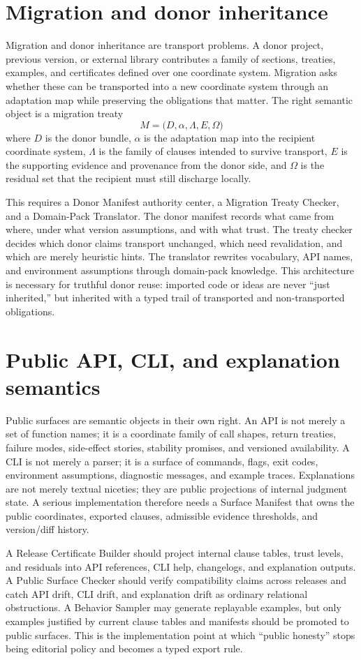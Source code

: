 \documentclass[11pt]{report}
\begin{document}
\section{Migration and donor inheritance}
Migration and donor inheritance are transport problems. A donor project, previous version, or external library contributes a family of sections, treaties, examples, and certificates defined over one coordinate system. Migration asks whether these can be transported into a new coordinate system through an adaptation map while preserving the obligations that matter. The right semantic object is a migration treaty
\[
M=\bigl(D,\alpha,\Lambda,E,\Omega\bigr)
\]
where $D$ is the donor bundle, $\alpha$ is the adaptation map into the recipient coordinate system, $\Lambda$ is the family of clauses intended to survive transport, $E$ is the supporting evidence and provenance from the donor side, and $\Omega$ is the residual set that the recipient must still discharge locally.

This requires a Donor Manifest authority center, a Migration Treaty Checker, and a Domain-Pack Translator. The donor manifest records what came from where, under what version assumptions, and with what trust. The treaty checker decides which donor claims transport unchanged, which need revalidation, and which are merely heuristic hints. The translator rewrites vocabulary, API names, and environment assumptions through domain-pack knowledge. This architecture is necessary for truthful donor reuse: imported code or ideas are never ``just inherited,'' but inherited with a typed trail of transported and non-transported obligations.
\section{Public API, CLI, and explanation semantics}
Public surfaces are semantic objects in their own right. An API is not merely a set of function names; it is a coordinate family of call shapes, return treaties, failure modes, side-effect stories, stability promises, and versioned availability. A CLI is not merely a parser; it is a surface of commands, flags, exit codes, environment assumptions, diagnostic messages, and example traces. Explanations are not merely textual niceties; they are public projections of internal judgment state. A serious implementation therefore needs a Surface Manifest that owns the public coordinates, exported clauses, admissible evidence thresholds, and version/diff history.

A Release Certificate Builder should project internal clause tables, trust levels, and residuals into API references, CLI help, changelogs, and explanation outputs. A Public Surface Checker should verify compatibility claims across releases and catch API drift, CLI drift, and explanation drift as ordinary relational obstructions. A Behavior Sampler may generate replayable examples, but only examples justified by current clause tables and manifests should be promoted to public surfaces. This is the implementation point at which ``public honesty'' stops being editorial policy and becomes a typed export rule.
\end{document}
